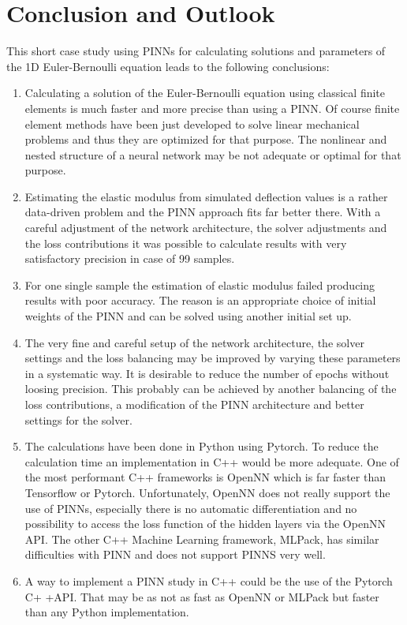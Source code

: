 \documentclass[a4paper,11pt]{article}
\begin{document}
\section{Conclusion and Outlook}
This short case study using PINNs for calculating solutions and parameters of the 1D Euler-Bernoulli equation leads to the following conclusions:
\begin{enumerate}
\item
Calculating a solution of the Euler-Bernoulli equation using classical finite elements is much faster and more precise than using a PINN. Of course finite element methods have been just developed to solve linear mechanical problems and thus they are optimized for that purpose. The nonlinear and nested structure of  a neural network may be not adequate or optimal for that purpose.
\item
Estimating the elastic modulus from simulated deflection values is a rather data-driven problem and the PINN approach fits far better there. With a careful adjustment of the network architecture, the solver adjustments and the loss contributions it was possible to calculate results with very satisfactory precision in case of 99 samples.
\item
For one single sample the estimation of elastic modulus failed producing results with poor accuracy. The reason is an appropriate choice of initial weights of the PINN and can be solved using another initial set up.
\item
The very fine and careful setup of the network architecture, the solver settings and the loss balancing may be improved by varying these parameters in a systematic way. It is desirable to reduce the number of epochs without loosing precision. This probably can be achieved by another balancing of the loss contributions, a modification of the PINN architecture and better settings for the solver.
\item
The calculations have been done in Python using Pytorch. To reduce the calculation time an implementation in C++ would be more adequate. One of the most performant  C++ frameworks is OpenNN which is far faster than Tensorflow or Pytorch. Unfortunately, OpenNN does not really support the use of PINNs, especially there is no automatic differentiation and no possibility to access the loss function of the hidden layers via the OpenNN API. The other C++ Machine Learning framework, MLPack, has similar difficulties with PINN and does not support PINNS very well.
\item
A way to implement a PINN study in C++ could be the use of the Pytorch C+ +API. That may be as not as fast as OpenNN or MLPack but faster than any Python implementation.
\end{enumerate}
\end{document}
